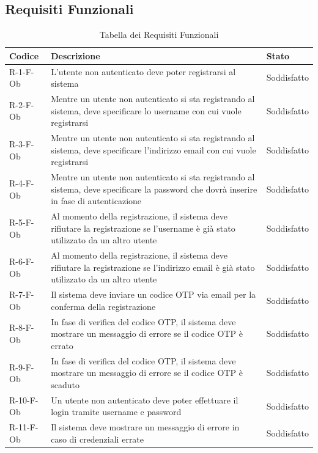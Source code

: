 \documentclass[a4paper, 11pt]{article}
\renewcommand{\arraystretch}{1.4}
\begin{document}
\subsection{Requisiti Funzionali}
\renewcommand{\arraystretch}{1.5}
\begin{longtable}[c]{ >{\centering\arraybackslash}m{2.5cm} >{\centering\arraybackslash}m{8.3cm} >{\centering\arraybackslash}m{3.5cm} }
  \caption{Tabella dei Requisiti Funzionali} \\
  \rowcolor{AccentDark}
  \color{white}\textbf{Codice} & \color{white}\textbf{Descrizione} & \color{white}\textbf{Stato} \\
  \endhead
R-1-F-Ob & L'utente non autenticato deve poter registrarsi al sistema & Soddisfatto\\
R-2-F-Ob & Mentre un utente non autenticato si sta registrando al sistema, deve specificare lo username con cui vuole registrarsi & Soddisfatto\\
R-3-F-Ob & Mentre un utente non autenticato si sta registrando al sistema, deve specificare l'indirizzo email con cui vuole registrarsi & Soddisfatto\\
R-4-F-Ob & Mentre un utente non autenticato si sta registrando al sistema, deve specificare la password che dovrà inserire in fase di autenticazione & Soddisfatto\\
R-5-F-Ob & Al momento della registrazione, il sistema deve rifiutare la registrazione se l'username è già stato utilizzato da un altro utente & Soddisfatto\\
R-6-F-Ob & Al momento della registrazione, il sistema deve rifiutare la registrazione se l'indirizzo email è già stato utilizzato da un altro utente & Soddisfatto\\
R-7-F-Ob & Il sistema deve inviare un codice OTP via email per la conferma della registrazione & Soddisfatto\\
R-8-F-Ob & In fase di verifica del codice OTP, il sistema deve mostrare un messaggio di errore se il codice OTP è errato & Soddisfatto\\
R-9-F-Ob & In fase di verifica del codice OTP, il sistema deve mostrare un messaggio di errore se il codice OTP è scaduto & Soddisfatto\\
R-10-F-Ob & Un utente non autenticato deve poter effettuare il login tramite username e password & Soddisfatto\\
R-11-F-Ob & Il sistema deve mostrare un messaggio di errore in caso di credenziali errate & Soddisfatto\\

\end{longtable}
\end{document}
